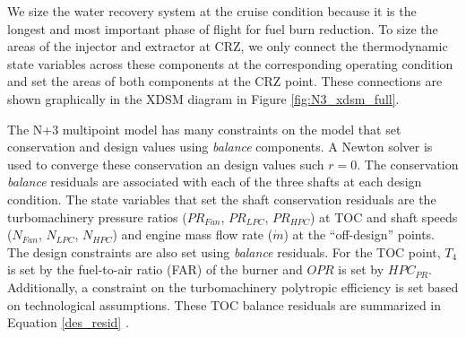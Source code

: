 \documentclass[conf]{new-aiaa}
\begin{document}
We size the water recovery system at the cruise condition because it is the longest and most important phase of flight for fuel burn reduction.
To size the areas of the injector and extractor at CRZ, we only connect the thermodynamic state variables across these components at the corresponding operating condition and set the areas of both components at the CRZ point.
These connections are shown graphically in the XDSM diagram in Figure \ref{fig:N3_xdsm_full}.

The N+3 multipoint model has many constraints on the model that set conservation and design values using \emph{balance} components.
A Newton solver is used to converge these conservation an design values such $r=0$.
The conservation \emph{balance} residuals are associated with each of the three shafts at each design condition.
The state variables that set the shaft conservation residuals are the turbomachinery pressure ratios ($PR_{Fan}$, $PR_{LPC}$, $PR_{HPC}$) at TOC and shaft speeds ($N_{Fan}$, $N_{LPC}$, $N_{HPC}$) and engine mass flow rate ($\dot{m}$) at the ``off-design'' points.
The design constraints are also set using \emph{balance} residuals.
For the TOC point, $T_{4}$ is set by the fuel-to-air ratio (FAR) of the burner and $OPR$ is set by $HPC_{PR}$.
Additionally, a constraint on the turbomachinery polytropic efficiency is set based on technological assumptions.
These TOC balance residuals are summarized in Equation \eqref{des_resid} \cite{Hendricks2019}.
\end{document}

